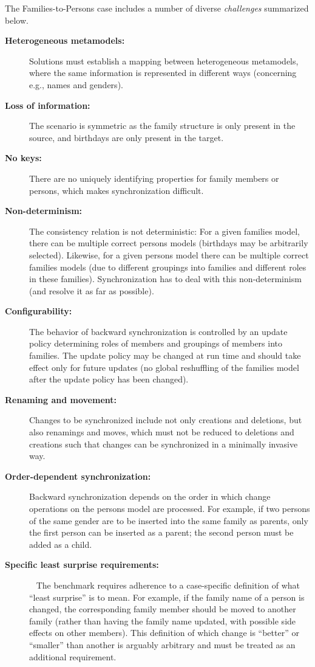 The Families-to-Persons case includes a number of diverse \emph{challenges} summarized below.

\begin{description}
	\item[\textbf{Heterogeneous metamodels:}] 
	Solutions must establish a mapping between heterogeneous metamodels, where the same information is represented in different ways (concerning e.g., names and genders).
	
	\item[\textbf{Loss of information:}] 
	The scenario is symmetric as the family structure is only present in the source, and birthdays are only present in the target.
	
	\item[\textbf{No keys:}] 
	There are no uniquely identifying properties for family members or persons, which makes synchronization difficult.
	
	\item[\textbf{Non-determinism:}] 
	The consistency relation is not de\-ter\-mi\-ni\-stic: For a given families model, there can be multiple correct persons models (birthdays may be arbitrarily selected). 
	Likewise, for a given persons model there can be multiple correct families models (due to different groupings into families and different roles in these families). Synchronization has to deal with this non-determinism (and resolve it as far as possible).
	
	\item[\textbf{Configurability:}] 
	The behavior of backward synchronization is controlled by an update policy determining roles of members and groupings of members into families. 
	The update policy may be changed at run time and should take effect only for future updates (no global reshuffling of the families model after the update policy has been changed).
	
	\item[\textbf{Renaming and movement:}] 
	Changes to be synchronized include not only creations and deletions, but also renamings and moves, which must not be reduced to deletions and creations  such that changes can be synchronized in a minimally invasive way. 
	
	\item[\textbf{Order-dependent synchronization:}] 
	Backward synchronization depends on the order in which change operations on the persons model are processed. 
	For example, if two persons of the same gender are to be inserted into the same family as parents, only the first person can be inserted as a parent; the second person must be added as a child.
	
	\item[\textbf{Specific least surprise requirements:}]~
	The bench\-mark requires adherence to a case-specific definition of what ``least surprise'' is to mean.
	For example, if the family name of a person is changed, the corresponding family member should be moved to another family (rather than having the family name updated, with possible side effects on other members).
	This definition of which change is ``better'' or ``smaller'' than another is arguably arbitrary and must be treated as an additional requirement.
\end{description}
